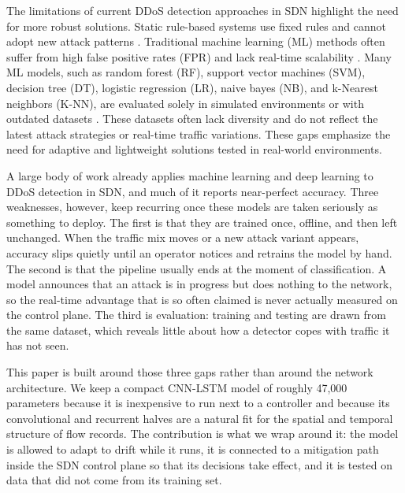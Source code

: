 \documentclass[ASNA,twocolumn]{USG} %
\begin{document}
 
The limitations of current DDoS detection approaches in SDN highlight the need for more robust solutions. Static rule-based systems use fixed rules and cannot adopt new attack patterns \cite{bringhenti2022automatic}. Traditional machine learning (ML) methods often suffer from high false positive rates (FPR) and lack real-time scalability \cite{ali2023machine}. Many ML models, such as random forest (RF), support vector machines (SVM), decision tree (DT), logistic regression (LR), naive bayes (NB), and k-Nearest neighbors (K-NN), are evaluated solely in simulated environments \cite{bansal2022comparative} or with outdated datasets \cite{gong2023survey}. These datasets often lack diversity and do not reflect the latest attack strategies or real-time traffic variations. These gaps emphasize the need for adaptive and lightweight solutions tested in real-world environments. 


A large body of work already applies machine learning and deep learning to DDoS detection in SDN, and much of it reports near-perfect accuracy. Three weaknesses, however, keep recurring once these models are taken seriously as something to deploy. The first is that they are trained once, offline, and then left unchanged. When the traffic mix moves or a new attack variant appears, accuracy slips quietly until an operator notices and retrains the model by hand. The second is that the pipeline usually ends at the moment of classification. A model announces that an attack is in progress but does nothing to the network, so the real-time advantage that is so often claimed is never actually measured on the control plane. The third is evaluation: training and testing are drawn from the same dataset, which reveals little about how a detector copes with traffic it has not seen.

This paper is built around those three gaps rather than around the network architecture. We keep a compact CNN-LSTM model of roughly 47,000 parameters because it is inexpensive to run next to a controller and because its convolutional and recurrent halves are a natural fit for the spatial and temporal structure of flow records. The contribution is what we wrap around it: the model is allowed to adapt to drift while it runs, it is connected to a mitigation path inside the SDN control plane so that its decisions take effect, and it is tested on data that did not come from its training set.
\end{document}
